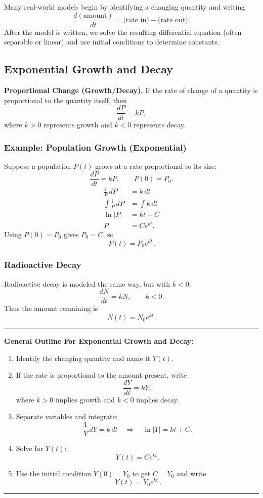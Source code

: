 \documentclass[11pt]{article}
\begin{document}
Many real-world models begin by identifying a changing quantity and writing
\[
\frac{d(\text{amount})}{dt}=\text{(rate in)}-\text{(rate out)}.
\]
After the model is written, we solve the resulting differential equation (often separable or linear) and use initial conditions to determine constants.

\subsection{Exponential Growth and Decay}

\noindent \textbf{Proportional Change (Growth/Decay).}
If the rate of change of a quantity is proportional to the quantity itself, then
\[
\frac{dP}{dt}=kP,
\]
where $k>0$ represents growth and $k<0$ represents decay.

\subsubsection*{Example: Population Growth (Exponential)}
Suppose a population $P(t)$ grows at a rate proportional to its size:
\[
\frac{dP}{dt}=kP,\qquad P(0)=P_0.
\]
\begin{align*}
\frac{1}{P}\,dP &= k\,dt\\
\int \frac{1}{P}\,dP &= \int k\,dt\\
\ln|P| &= kt + C\\
P &= Ce^{kt}.
\end{align*}
Using $P(0)=P_0$ gives $P_0=C$, so
\[
\boxed{\,P(t)=P_0e^{kt}\,}.
\]

\subsubsection*{Radioactive Decay}
Radioactive decay is modeled the same way, but with $k<0$:
\[
\frac{dN}{dt}=kN,\qquad k<0.
\]
Thus the amount remaining is
\[
\boxed{\,N(t)=N_0e^{kt}\,}.
\]

\noindent\rule{\linewidth}{0.4pt}
\textbf{General Outline For Exponential Growth and Decay:}
\begin{enumerate}[topsep=2pt, itemsep=2pt, leftmargin=*]
    \item Identify the changing quantity and name it $Y(t)$.
    \item If the rate is proportional to the amount present, write
    \[
    \frac{dY}{dt}=kY,
    \]
    where $k>0$ implies growth and $k<0$ implies decay.
    \item Separate variables and integrate:
    \[
    \frac{1}{Y}\,dY = k\,dt
    \quad\Rightarrow\quad
    \ln|Y|=kt+C.
    \]
    \item Solve for $Y(t)$:
    \[
    Y(t)=Ce^{kt}.
    \]
    \item Use the initial condition $Y(0)=Y_0$ to get $C=Y_0$ and write
    \[
    \boxed{\,Y(t)=Y_0e^{kt}\,}.
    \]
\end{enumerate}
\noindent\rule{\linewidth}{0.4pt}
\end{document}
